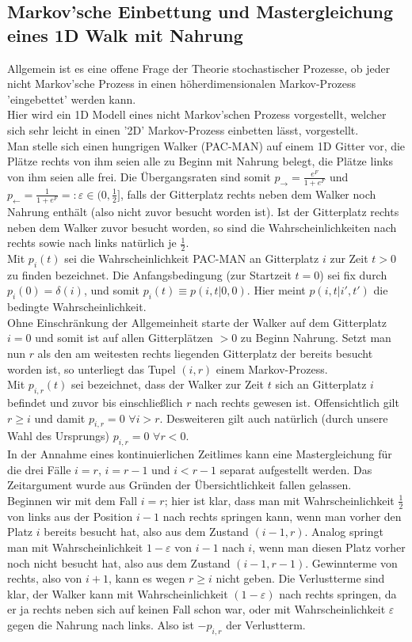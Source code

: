 \documentclass[a4paper, 12pt]{report}
\begin{document}
\subsection{Markov'sche Einbettung und Mastergleichung eines 1D Walk mit Nahrung}
Allgemein ist es eine offene Frage der Theorie stochastischer Prozesse, ob jeder nicht Markov'sche Prozess in einen höherdimensionalen Markov-Prozess 'eingebettet' werden kann.
\\
Hier wird ein 1D Modell eines nicht Markov'schen Prozess vorgestellt, welcher sich sehr leicht in einen '2D' Markov-Prozess einbetten lässt, vorgestellt.
\\
Man stelle sich einen hungrigen Walker (PAC-MAN) auf einem 1D Gitter vor, die Plätze rechts von ihm seien alle zu Beginn mit Nahrung belegt, die Plätze links von ihm seien alle frei. Die Übergangsraten sind somit $p_{\rightarrow} = \frac{e^F}{1+e^F}$ und $p_{\leftarrow} = \frac{1}{1+e^F}=:\varepsilon \in (0,\frac{1}{2}]$, falls der Gitterplatz rechts neben dem Walker noch Nahrung enthält (also nicht zuvor besucht worden ist). Ist der Gitterplatz rechts neben dem Walker zuvor besucht worden, so sind die Wahrscheinlichkeiten nach rechts sowie nach links natürlich je $\frac{1}{2}$.
\\
Mit $p_i(t)$ sei die Wahrscheinlichkeit PAC-MAN an Gitterplatz $i$ zur Zeit $t>0$ zu finden bezeichnet. Die Anfangsbedingung (zur Startzeit $t=0$) sei fix durch $p_i(0) =\delta(i)$, und somit $p_i(t) \equiv p(i,t|0,0)$. Hier meint $p(i,t|i',t')$ die bedingte Wahrscheinlichkeit.
\\
Ohne Einschränkung der Allgemeinheit starte der Walker auf dem Gitterplatz $i=0$ und somit ist auf allen Gitterplätzen $>0$ zu Beginn Nahrung. Setzt man nun $r$ als den am weitesten rechts liegenden Gitterplatz der bereits besucht worden ist, so unterliegt das Tupel $(i,r)$ einem Markov-Prozess.
\\
Mit $p_{i,r}(t)$ sei bezeichnet, dass der Walker zur Zeit $t$ sich an Gitterplatz $i$ befindet und zuvor bis einschließlich $r$ nach rechts gewesen ist. Offensichtlich gilt $r \geq i$ und damit  $p_{i,r}=0$  $\forall i>r$. Desweiteren gilt auch natürlich (durch unsere Wahl des Ursprungs) $p_{i,r}=0$ $\forall r<0$.
\\
In der Annahme eines kontinuierlichen Zeitlimes kann eine Mastergleichung für die drei Fälle $i=r$, $i=r-1$ und $i<r-1$ separat aufgestellt werden. Das Zeitargument wurde aus Gründen der Übersichtlichkeit fallen gelassen.
\\
Beginnen wir mit dem Fall $i=r$; hier ist klar, dass man mit Wahrscheinlichkeit $\frac{1}{2}$ von links aus der Position $i-1$ nach rechts springen kann, wenn man vorher den Platz $i$ bereits besucht hat, also aus dem Zustand $(i-1,r)$. Analog springt man mit Wahrscheinlichkeit $1-\varepsilon$ von $i-1$ nach $i$, wenn man diesen Platz vorher noch nicht besucht hat, also aus dem Zustand $(i-1,r-1)$. Gewinnterme von rechts, also von $i+1$, kann es wegen $ r\geq i$ nicht geben. Die Verlustterme sind klar, der Walker kann mit Wahrscheinlichkeit $(1-\varepsilon)$ nach rechts springen, da er ja rechts neben sich auf keinen Fall schon war, oder mit Wahrscheinlichkeit $\varepsilon$ gegen die Nahrung nach links. Also ist $-p_{i,r}$ der Verlustterm.
\end{document}
